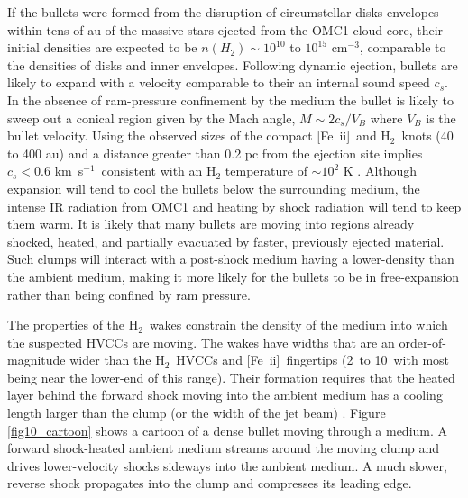 \documentclass{aa}
\newcommand{\cmq}{cm{$^{-3}$}}
\newcommand{\kms}{km~s{$^{-1}$}}
\newcommand{\Feii}{[Fe~{\sc ii}]}
\newcommand{\hh}{\ensuremath{\textrm{H}_{2}}}			%
\begin{document}
If the bullets were formed from the disruption of circumstellar disks envelopes 
within tens of au of the massive stars ejected from the OMC1 cloud core, 
their initial densities are expected to be  $n(H_2) \sim 10^{10}$ to $10^{15}$ \cmq , 
comparable to the densities of disks and inner envelopes.  Following dynamic ejection,  
bullets  are likely  to expand with a velocity comparable to their an internal sound 
speed $c_s$.  In the absence of ram-pressure confinement by the medium the bullet
is likely to sweep out a conical region given by the Mach angle,  $M \sim 2 c_s/ V_B$
where $V_B$ is the bullet velocity.   Using the observed sizes of the compact \Feii\ and \hh\ 
knots (40 to 400 au)  and a distance greater than 0.2 pc from the ejection site implies 
$c_s < 0.6$ \kms\  consistent with an H$_2$ temperature of $\sim 10^2$ K .   Although 
expansion will tend to cool the bullets below the surrounding medium,
the intense IR radiation from OMC1 and  heating by shock radiation will tend to
keep them warm.   It is likely that many bullets are moving into regions already 
shocked, heated, and partially evacuated by faster, previously ejected material.  
Such clumps will  interact with a post-shock medium having a lower-density than 
the ambient medium, making it more likely  for the bullets to be in free-expansion
rather than  being confined by  ram pressure.    

The  properties of the \hh\  wakes  constrain the density of the 
medium into which the suspected HVCCs are moving.   The wakes have widths that are 
an order-of-magnitude wider than the \hh\ HVCCs and \Feii\  fingertips (2\arcsec\ to 10\arcsec\ 
with most being near the lower-end of this range).   Their formation requires 
that the heated layer behind the forward shock moving into the ambient medium
has a cooling length  larger than the clump  (or the width of
the  jet beam) \citep{Blondin1990}.       Figure \ref{fig10_cartoon}  shows a cartoon of a 
dense bullet moving through a medium.    A forward shock-heated  ambient medium  
streams around the moving clump and drives  lower-velocity shocks sideways 
into the ambient medium.   A much slower, reverse shock propagates into the clump
and compresses its leading edge. 
\end{document}

